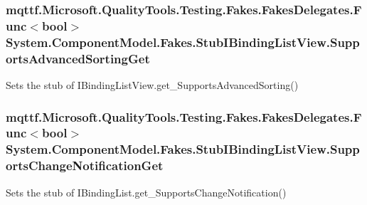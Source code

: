 \hypertarget{class_system_1_1_component_model_1_1_fakes_1_1_stub_i_binding_list_view_ac189000bd7db9c82540b516d34eac225}{
\subsubsection[{Supports\-Advanced\-Sorting\-Get}]{\setlength{\rightskip}{0pt plus 5cm}mqttf.\-Microsoft.\-Quality\-Tools.\-Testing.\-Fakes.\-Fakes\-Delegates.\-Func$<$bool$>$ System.\-Component\-Model.\-Fakes.\-Stub\-I\-Binding\-List\-View.\-Supports\-Advanced\-Sorting\-Get}}\label{class_system_1_1_component_model_1_1_fakes_1_1_stub_i_binding_list_view_ac189000bd7db9c82540b516d34eac225}


Sets the stub of I\-Binding\-List\-View.\-get\-\_\-\-Supports\-Advanced\-Sorting()

\hypertarget{class_system_1_1_component_model_1_1_fakes_1_1_stub_i_binding_list_view_a99cfbc872f06d13ccbacc59033f1bda5}{
\subsubsection[{Supports\-Change\-Notification\-Get}]{\setlength{\rightskip}{0pt plus 5cm}mqttf.\-Microsoft.\-Quality\-Tools.\-Testing.\-Fakes.\-Fakes\-Delegates.\-Func$<$bool$>$ System.\-Component\-Model.\-Fakes.\-Stub\-I\-Binding\-List\-View.\-Supports\-Change\-Notification\-Get}}\label{class_system_1_1_component_model_1_1_fakes_1_1_stub_i_binding_list_view_a99cfbc872f06d13ccbacc59033f1bda5}


Sets the stub of I\-Binding\-List.\-get\-\_\-\-Supports\-Change\-Notification()


